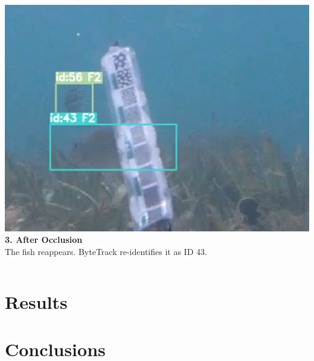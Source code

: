 \documentclass[serif]{beamer}  %
\begin{document}
\begin{frame}
\begin{columns}[T,totalwidth=\textwidth]
        \begin{column}{0.32\textwidth}
            \centering
            \includegraphics[width=\linewidth]{images/occlusion_3.png}
            \vspace{0.5em}
            \tiny
            \textbf{3. After Occlusion} \\
            The fish reappears. ByteTrack re-identifies it as ID 43.
        \end{column}
    \end{columns}
\end{frame}


\section{Results}

\section{Conclusions}



\end{document}
